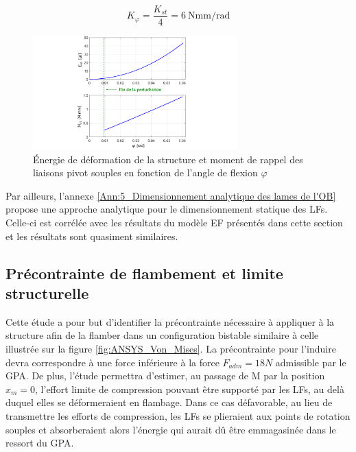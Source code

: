 \begin{equation}
		K_{\varphi} = \frac{K_{st}}{4} = 6\ \text{Nmm/rad}
		\label{eq:définition_K_phi}
\end{equation}
\begin{figure}[!ht]
	\begin{center}
		\captionsetup{justification=centering}
		\includegraphics[trim={7cm 0cm 8cm 0cm},clip, width=0.7\textwidth]{../Chap3/Figure/ANSYS_energie+moment.pdf}
		\caption{Énergie de déformation de la structure et moment de rappel des liaisons pivot souples en fonction de l'angle de flexion $\varphi$}
		\label{fig:ANSYS_energie+moment}
	\end{center}
\end{figure}

Par ailleurs, l'annexe \ref{Ann:5_Dimensionnement analytique des lames de l'OB} propose une approche analytique pour le dimensionnement statique des LFs. Celle-ci est corrélée avec les résultats du modèle EF présentés dans cette section et les résultats sont quasiment similaires. 
	\subsection{Précontrainte de flambement et limite structurelle}
	\label{sec:3.3.1_Limite structurelle et précontrainte de flambement}
Cette étude a pour but d'identifier la précontrainte nécessaire à appliquer à la structure afin de la flamber dans un configuration bistable similaire à celle illustrée sur la figure \ref{fig:ANSYS_Von_Mises}. La précontrainte pour l'induire devra correspondre à une force inférieure à la force $F_{adm}=18N$ admissible par le GPA. De plus, l'étude permettra d'estimer, au passage de M par la position $x_m=0$, l'effort limite de compression pouvant être supporté par les LFs, au delà duquel elles se déformeraient en flambage. Dans ce cas défavorable, au lieu de transmettre les efforts de compression, les LFs se plieraient aux points de rotation souples et absorberaient alors l'énergie qui aurait dû être emmagasinée dans le ressort du GPA.

